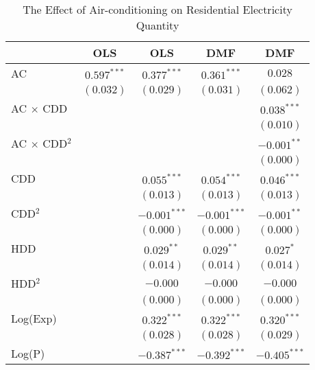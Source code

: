 
\begin{table}[htbp]
\caption{The Effect of Air-conditioning on Residential Electricity Quantity}
\begin{center}
\begin{tabular}{l c c c c}
\hline
 & OLS & OLS & DMF & DMF \\
\hline
AC                        & $0.597^{***}$ & $0.377^{***}$  & $0.361^{***}$  & $0.028$        \\
                          & $(0.032)$     & $(0.029)$      & $(0.031)$      & $(0.062)$      \\
AC $\times$ CDD           &               &                &                & $0.038^{***}$  \\
                          &               &                &                & $(0.010)$      \\
AC $\times$ CDD$^2$       &               &                &                & $-0.001^{**}$  \\
                          &               &                &                & $(0.000)$      \\
CDD                       &               & $0.055^{***}$  & $0.054^{***}$  & $0.046^{***}$  \\
                          &               & $(0.013)$      & $(0.013)$      & $(0.013)$      \\
CDD$^2$                   &               & $-0.001^{***}$ & $-0.001^{***}$ & $-0.001^{**}$  \\
                          &               & $(0.000)$      & $(0.000)$      & $(0.000)$      \\
HDD                       &               & $0.029^{**}$   & $0.029^{**}$   & $0.027^{*}$    \\
                          &               & $(0.014)$      & $(0.014)$      & $(0.014)$      \\
HDD$^2$                   &               & $-0.000$       & $-0.000$       & $-0.000$       \\
                          &               & $(0.000)$      & $(0.000)$      & $(0.000)$      \\
Log(Exp)                  &               & $0.322^{***}$  & $0.322^{***}$  & $0.320^{***}$  \\
                          &               & $(0.028)$      & $(0.028)$      & $(0.029)$      \\
Log(P)                    &               & $-0.387^{***}$ & $-0.392^{***}$ & $-0.405^{***}$ \\

\end{tabular}
\end{center}
\end{table}
